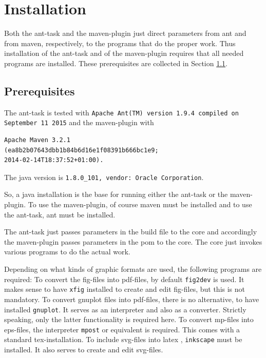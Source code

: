 \documentclass[12pt]{article}
\begin{document}
\section{Installation}

Both the ant-task and the maven-plugin just direct parameters 
from ant and from maven, respectively, 
to the programs that do the proper work. 
Thus installation of the ant-task and of the maven-plugin 
requires that all needed programs are installed. 
These prerequisites are collected in Section \ref{subsec:prerequisites}. 

\subsection{Prerequisites}\label{subsec:prerequisites}

The ant-task is tested with 
{\tt Apache Ant(TM) version 1.9.4 compiled on September 11 2015}
and the maven-plugin with 
%
\begin{verbatim}
Apache Maven 3.2.1
(ea8b2b07643dbb1b84b6d16e1f08391b666bc1e9; 
2014-02-14T18:37:52+01:00). 
\end{verbatim}
The java version is {\tt 1.8.0\_101, vendor: Oracle Corporation}. 

So, a java installation is the base for running either the ant-task 
or the maven-plugin. 
To use the maven-plugin, of course maven must be installed 
and to use the ant-task, ant must be installed. 

The ant-task just passes parameters in the build file to the core 
and accordingly the maven-plugin passes parameters in the pom 
to the core. 
The core just invokes various programs to do the actual work. 

Depending on what kinds of graphic formats are used, 
the following programs are required: 
To convert the \gls{fig}-files into \gls{pdf}-files, 
by default {\tt fig2dev} is used. 
It makes sense to have {\tt xfig} installed 
to create and edit fig-files, but this is not mandatory. 
To convert gnuplot files into pdf-files, there is no alternative, 
to have installed {\tt gnuplot}. 
It serves as an interpreter and also as a converter. 
Strictly speaking, only the latter functionality is required here. 
To convert \gls{mp}-files into \gls{eps}-files, 
the interpreter {\tt mpost} or equivalent is required. 
This comes with a standard tex-installation. 
To include \gls{svg}-files into latex , 
{\tt inkscape} must be installed. 
It also serves to create and edit svg-files. 
\end{document}
